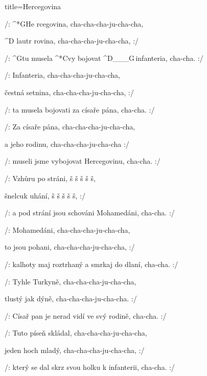 \begin{song}{title=\predtitle\centering Hercegovina \\\large \vspace*{-0.3cm}}  %
\begin{centerjustified}
\nejnejvetsi

\sloka 
	/: ^*{G}He  rcegovina, cha-cha-cha-ju-cha-cha,
	
	^{D\,\,}lautr rovina, cha-cha-cha-ju-cha-cha, :/
	
	/: ^{G}tu musela ^*{C}vy bojovat ^{D{\color{white}\_\_\_}G\,}infanteria, cha-cha. :/
	
\sloka
	/: Infanteria, cha-cha-cha-ju-cha-cha,
	
	čestná setnina, cha-cha-cha-ju-cha-cha, :/
	
	/: ta musela bojovati za císaře pána, cha-cha. :/
	
\sloka
	/: Za císaře pána, cha-cha-cha-ju-cha-cha,
	
	a jeho rodinu, cha-cha-cha-ju-cha-cha :/
	
	/: museli jsme vybojovat Hercegovinu, cha-cha. :/
	
\sloka
	/: Vzhůru po stráni, š š š š š,
	
	šnelcuk uhání, š š š š š, :/
	
	/: a pod strání jsou schováni Mohamedáni, cha-cha. :/
	
\sloka
	/: Mohamedáni, cha-cha-cha-ju-cha-cha,
	
	to jsou pohani, cha-cha-cha-ju-cha-cha, :/
	
	/: kalhoty maj roztrhaný a smrkaj do dlaní, cha-cha. :/
	
\sloka
	/: Tyhle Turkyně, cha-cha-cha-ju-cha-cha,
	
	tlustý jak dýně, cha-cha-cha-ju-cha-cha. :/
	
	/: Císař pan je nerad vidí ve svý rodině, cha-cha. :/
	
\sloka
	/: Tuto píseň skládal, cha-cha-cha-ju-cha-cha,
	
	jeden hoch mladý, cha-cha-cha-ju-cha-cha, :/
	
	/: který se dal skrz svou holku k infanterii, cha-cha. :/
	

\end{centerjustified}
\setcounter{Slokočet}{0}
\end{song}
